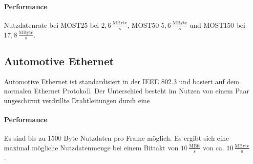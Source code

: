 \paragraph{Performance}
Nutzdatenrate bei MOST25 bei $ 2,6\,\frac{\mathrm{MByte}}{\mathrm{s}} $, MOST50 $ 5,6\,\frac{\mathrm{MByte}}{\mathrm{s}} $  und MOST150 bei $ 17,8\,\frac{\mathrm{MByte}}{\mathrm{s}} $.
\cite[Vgl. Seite 119 ff.]{Zimmermann.2014}
\subsection{Automotive Ethernet}
Automotive Ethernet ist standardisiert in der IEEE 802.3 und basiert auf dem normalen Ethernet Protokoll. Der Unterschied besteht im Nutzen von einem Paar ungeschirmt verdrillte Drahtleitungen durch eine
\paragraph{Performance}
Es sind bis zu 1500 Byte Nutzdaten pro Frame möglich. Es ergibt sich eine maximal mögliche Nutzdatenmenge bei einem Bittakt von $ 10\,\frac{\mathrm{MBit}}{\mathrm{s}} $ von ca. $ 10\,\frac{\mathrm{MByte}}{\mathrm{s}} $. \cite[Vgl. Seite 138 ff.]{Zimmermann.2014}
